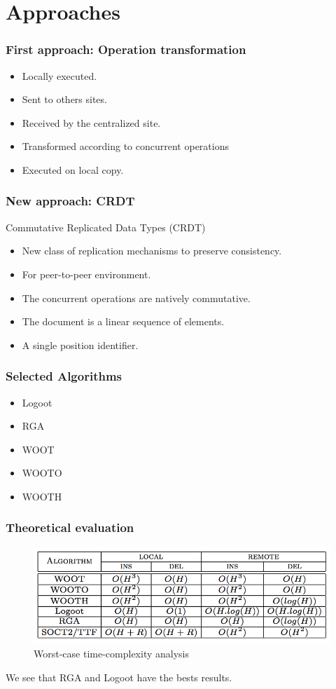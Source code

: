 \documentclass[14pt]{beamer}
\begin{document}
\section{Approaches}
	\begin{frame}
		\frametitle{First approach: Operation transformation}
		\begin{itemize}
			\item Locally executed.
			\item Sent to others sites.
			\item Received by the centralized site.
			\item Transformed according to concurrent operations
			\item Executed on local copy.	
		\end{itemize}
	\end{frame}
	\begin{frame}
		\frametitle{New approach: CRDT}
		Commutative Replicated Data Types (CRDT)
		\begin{itemize}
			\item New class of replication mechanisms to preserve consistency.
			\item For peer-to-peer environment.
			\item The concurrent operations are natively commutative.
			\item The document is a linear sequence of elements.
			\item A single position identifier.
		\end{itemize}
	\end{frame}
	\begin{frame}
		\frametitle{Selected Algorithms}
		\begin{itemize}
			\item Logoot
			\item RGA
			\item WOOT
			\item WOOTO
			\item WOOTH
		\end{itemize}
	\end{frame}
	\begin{frame}
		\frametitle{Theoretical evaluation}
		\begin{figure}
			\includegraphics[scale=0.3]{../includes/worst.png}
			\caption{Worst-case time-complexity analysis}
	   	\end{figure}
	   	We see that RGA and Logoot have the bests results.
	\end{frame}
	
\end{document}
